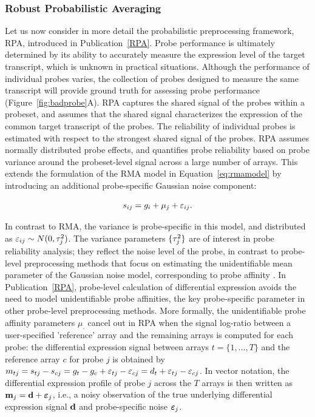 \subsubsection{Robust Probabilistic Averaging}

Let us now consider in more detail the probabilistic preprocessing
framework, RPA, introduced in Publication~\ref{RPA}. Probe performance
is ultimately determined by its ability to accurately measure the
expression level of the target transcript, which is unknown in
practical situations.  Although the performance of individual probes
varies, the collection of probes designed to measure the same
transcript will provide ground truth for assessing probe performance
(Figure~\ref{fig:badprobe}A). RPA captures the shared signal of the
probes within a probeset, and assumes that the shared signal
characterizes the expression of the common target transcript of the
probes. The reliability of individual probes is estimated with respect
to the strongest shared signal of the probes. RPA assumes normally
distributed probe effects, and quantifies probe reliability based on
probe variance around the probeset-level signal across a large number
of arrays. This extends the formulation of the RMA model in
Equation~\ref{eq:rmamodel} by introducing an additional probe-specific
Gaussian noise component:

\begin{equation}\label{eq:rpa}
  s_{ij} = g_i + \mathbf{\mu}_j + \mathbf{\varepsilon}_{ij}.
\end{equation}

\noindent In contrast to RMA, the variance is probe-specific in this
model, and distributed as \(\mathbf{\varepsilon}_{ij} \sim N(0,\mathbf{\tau}_j^2)\). The
variance parameters \(\{\tau_j^2\}\) are of interest in probe reliability
analysis; they reflect the noise level of the probe, in contrast to
probe-level preprocessing methods that focus on estimating the
unidentifiable mean parameter of the Gaussian noise model,
corresponding to probe affinity \citep[see e.g.][]{Irizarry03rma,
  Li01mbei}. In Publication~\ref{RPA}, probe-level calculation of
differential expression avoids the need to model unidentifiable probe
affinities, the key probe-specific parameter in other probe-level
preprocessing methods. More formally, the unidentifiable probe
affinity parameters \(\mu_.\) cancel out in RPA when the signal
log-ratio between a user-specified 'reference' array and the remaining
arrays is computed for each probe: the differential expression signal
between arrays \(t = \{1, \dots, T\} \) and the reference array \(c\)
for probe \(j\) is obtained by \(m_{tj} = s_{tj} - s_{cj} = g_t - g_c +
\varepsilon_{tj} - \varepsilon_{cj} = d_t + \varepsilon_{tj} - \varepsilon_{cj}\). In vector
notation, the differential expression profile of probe \(j\) across
the \(T\) arrays is then written as \(\mathbf{m}_j = \mathbf{d} + \boldsymbol{\varepsilon}_j\), i.e.,
a noisy observation of the true underlying differential expression
signal \(\mathbf{d}\) and probe-specific noise \(\boldsymbol{\varepsilon}_j\).


